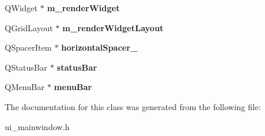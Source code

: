 \begin{DoxyCompactItemize}
\item 
\hypertarget{classUi__MainWindow_abef6893087fd2a18d10d930b3562beba}{Q\-Widget $\ast$ {\bfseries m\-\_\-render\-Widget}}\label{classUi__MainWindow_abef6893087fd2a18d10d930b3562beba}

\item 
\hypertarget{classUi__MainWindow_a875c5226b3c786bdc82ed8a385122cde}{Q\-Grid\-Layout $\ast$ {\bfseries m\-\_\-render\-Widget\-Layout}}\label{classUi__MainWindow_a875c5226b3c786bdc82ed8a385122cde}

\item 
\hypertarget{classUi__MainWindow_ae2007c6e48638f819d3ac57be8daa4ca}{Q\-Spacer\-Item $\ast$ {\bfseries horizontal\-Spacer\-\_}}\label{classUi__MainWindow_ae2007c6e48638f819d3ac57be8daa4ca}

\item 
\hypertarget{classUi__MainWindow_a50fa481337604bcc8bf68de18ab16ecd}{Q\-Status\-Bar $\ast$ {\bfseries status\-Bar}}\label{classUi__MainWindow_a50fa481337604bcc8bf68de18ab16ecd}

\item 
\hypertarget{classUi__MainWindow_a2be1c24ec9adfca18e1dcc951931457f}{Q\-Menu\-Bar $\ast$ {\bfseries menu\-Bar}}\label{classUi__MainWindow_a2be1c24ec9adfca18e1dcc951931457f}

\end{DoxyCompactItemize}


The documentation for this class was generated from the following file\-:\begin{DoxyCompactItemize}
\item 
ui\-\_\-mainwindow.\-h\end{DoxyCompactItemize}
